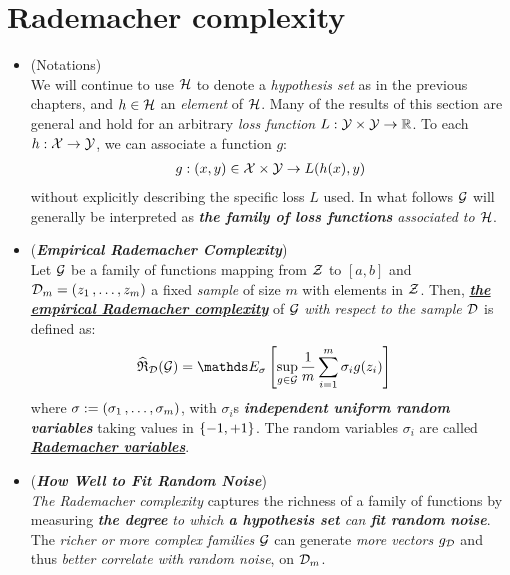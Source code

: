 \documentclass[11pt]{article}
\begin{document}
\section{Rademacher complexity}
\begin{itemize}
\item \begin{remark} (Notations)\\
We will continue to use ${\mathcal H}$ to denote a \emph{hypothesis set} as in the previous chapters, and $h \in {\mathcal H}$ an \emph{element} of ${\mathcal H}$. Many of the results of this section are general and hold for an arbitrary \emph{loss function} $L: {\mathcal Y} \times {\mathcal Y} \to {\mathbb R}$. To each $h: {\mathcal X} \to {\mathcal Y}$, we can associate a function $g$:
\begin{align*}
g: (x, y) \in {\mathcal X} \times {\mathcal Y} \to L(h(x), y)
\end{align*} without explicitly describing the specific loss $L$ used. In what follows ${\mathcal G}$ will generally be interpreted as \emph{\textbf{the family of loss functions} associated to ${\mathcal H}$}.
\end{remark}


\item \begin{definition} (\emph{\textbf{Empirical Rademacher Complexity}})\\
Let ${\mathcal G}$ be a family of functions mapping from ${\mathcal Z}$ to $[a, b]$ and ${\mathcal D}_{m} = (z_1 \,{,}\ldots{,}\, z_m)$ a fixed \emph{sample} of size $m$ with elements in ${\mathcal Z}$. Then, \underline{\emph{\textbf{the empirical Rademacher complexity}}} of ${\mathcal G}$ \emph{with respect to the sample ${\mathcal D}$} is defined as:
\begin{align}
\widehat{\mathfrak{R}}_{\cD}(\cG)&= \E{\sigma}{\sup_{g \in \cG}\frac{1}{m}\sum_{i=1}^{m}\sigma_{i}g(z_i)}   \label{eqn: rademacher_complexity}
\end{align}
where $\sigma := (\sigma_1 \,{,}\ldots{,}\, \sigma_m)$, with $\sigma_i$s \textbf{\emph{independent uniform random variables}} taking values in $\left\{-1, +1\right\}$. The random variables $\sigma_i$ are called \underline{\emph{\textbf{Rademacher variables}}}.
\end{definition}

\item \begin{remark} (\emph{\textbf{How Well to Fit Random Noise}})\\
\emph{The Rademacher complexity} captures the richness of a family of functions by measuring \emph{\textbf{the degree} to which \textbf{a hypothesis set} can \textbf{fit random noise}}. The \emph{richer or more complex families} ${\mathcal G}$ can generate \emph{more vectors} $g_{{\mathcal D}}$ and thus \emph{better correlate with random noise}, on ${\mathcal D}_m$.


\end{remark}
\end{itemize}
\end{document}
